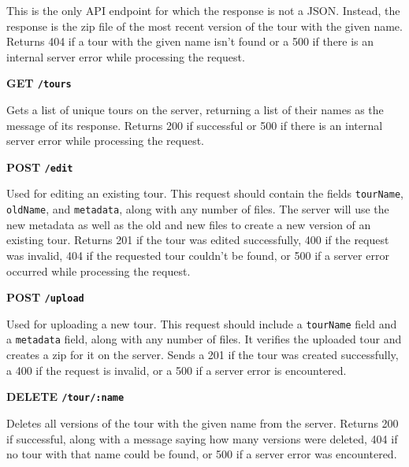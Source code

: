 \documentclass[a4paper, 10pt, american, titlepage]{article}
\newenvironment{indented}[1]%
{\begin{list}{}%
	{\setlength{\leftmargin}{#1}}%
	\item[]%
}
{\end{list}}
\begin{document}
\begin{indented}{1cm}
	This is the only API endpoint for which the response is not a JSON. Instead,
	the response is the zip file of the most recent version of the tour with the
	given name. Returns 404 if a tour with the given name isn't found or a 500
	if there is an internal server error while processing the request.
\end{indented}

\noindent\textbf{GET \texttt{/tours}}

\begin{indented}{1cm}
	Gets a list of unique tours on the server, returning a list of their names
	as the message of its response. Returns 200 if successful or 500 if there is
	an internal server error while processing the request.
\end{indented}

\noindent\textbf{POST \texttt{/edit}}

\begin{indented}{1cm}
	Used for editing an existing tour. This request should contain the fields
	\texttt{tourName}, \texttt{oldName}, and \texttt{metadata}, along with any
	number of files.  The server will use the new metadata as well as the old
	and new files to create a new version of an existing tour. Returns 201 if
	the tour was edited successfully, 400 if the request was invalid, 404 if the
	requested tour couldn't be found, or 500 if a server error occurred while
	processing the request.
\end{indented}

\noindent\textbf{POST \texttt{/upload}}

\begin{indented}{1cm}
	Used for uploading a new tour. This request should include a
	\texttt{tourName} field and a \texttt{metadata} field, along with any number
	of files. It verifies the uploaded tour and creates a zip for it on the
	server. Sends a 201 if the tour was created successfully, a 400 if the
	request is invalid, or a 500 if a server error is encountered.
\end{indented}

\noindent\textbf{DELETE \texttt{/tour/:name}}

\begin{indented}{1cm}
	Deletes all versions of the tour with the given name from the server.
	Returns 200 if successful, along with a message saying how many versions
	were deleted, 404 if no tour with that name could be found, or 500 if a
	server error was encountered.
\end{indented}
\end{document}
